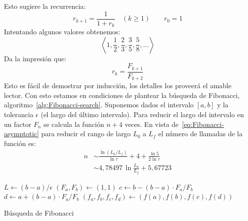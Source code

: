   Esto sugiere la recurrencia:
  \begin{equation}
    \label{eq:Fibonacci-search-recurrence}
    r_{k + 1}
      = \frac{1}{1 + r_k}
      \quad (k \ge 1)
      \qquad r_0 = 1
  \end{equation}
  Intentando algunos valores obtenemos:
  \begin{equation*}
    \left\langle
      1, \frac{1}{2}, \frac{2}{3}, \frac{3}{5}, \frac{5}{8}, \dotsc
    \right\rangle
  \end{equation*}
  Da la impresión que:
  \begin{equation}
    \label{eq:Fibonacci-search-solution}
    r_k
      = \frac{F_{k + 1}}{F_{k + 2}}
  \end{equation}
  Esto es fácil de demostrar por inducción,
  los detalles los proveerá el amable lector.
  Con esto estamos en condiciones de plantear
  la búsqueda de Fibonacci,
  algoritmo~\ref{alg:Fibonacci-search}.
  Suponemos dados el intervalo \([a, b]\)
  y la tolerancia \(\epsilon\)
  (el largo del último intervalo).
  Para reducir el largo del intervalo en un factor \(F_n\)
  se calcula la función \(n + 4\) veces.
  En vista de~\eqref{eq:Fibonacci-asymptotic}
  para reducir el rango de largo \(L_0\) a \(L_f\)
  el número de llamadas de la función es:
  \begin{align*}
    n &\sim \frac{\ln (L_0 / L_f)}{\ln \tau}
	      + 4 + \frac{\ln 5}{2 \ln \tau} \\
      &\sim 4,78497 \, \ln \frac{L_0}{L_f} + 5,67723
  \end{align*}
  \begin{algorithm}[htbp]
    \DontPrintSemicolon

    \KwFunction {} \;
    \BlankLine
    \(L \leftarrow (b - a) / \epsilon\) \;
    \((F_a, F_b) \leftarrow (1, 1)\) \;
    \(c \leftarrow b - (b - a) \cdot F_a / F_b\) \;
    \(d \leftarrow a + (b - a) \cdot F_a / F_b\) \;
    \((f_a, f_b, f_c, f_d) \leftarrow (f(a), f(b), f(c), f(d))\) \;
    \caption{Búsqueda de Fibonacci}
    \label{alg:Fibonacci-search}
  \end{algorithm}


